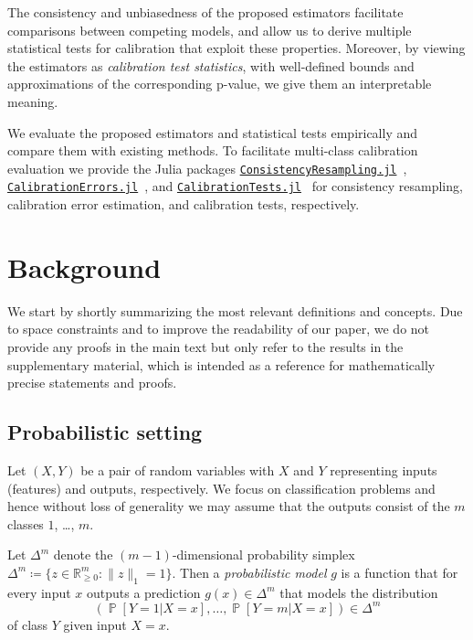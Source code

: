 \documentclass{article}
\DeclareMathOperator{\Prob}{\mathbb{P}}
\begin{document}
The consistency and unbiasedness of the proposed estimators facilitate
comparisons between competing models, and allow us to derive multiple
statistical tests for calibration that exploit these properties. Moreover, by
viewing the estimators as \emph{calibration test statistics}, with well-defined
bounds and approximations of the corresponding p-value, we give them an
interpretable meaning.

We evaluate the proposed estimators and statistical tests empirically and
compare them with existing methods. To facilitate multi-class calibration
evaluation we provide the Julia packages \href{https://github.com/devmotion/ConsistencyResampling.jl}{\texttt{ConsistencyResampling.jl}}~\citep{widmann19_consis_resampling},
\href{https://github.com/devmotion/CalibrationErrors.jl}{\texttt{CalibrationErrors.jl}}~\citep{widmann19_calib_errors}, and
\href{https://github.com/devmotion/CalibrationTests.jl}{\texttt{CalibrationTests.jl}}~\citep{widmann19_calib_tests}
for consistency resampling, calibration error estimation, and calibration tests,
respectively.

\section{Background}

We start by shortly summarizing the most relevant definitions and concepts. Due
to space constraints and to improve the readability of our paper, we do not
provide any proofs in the main text but only refer to the results in the
supplementary material, which is intended as a reference for mathematically
precise statements and proofs.

\subsection{Probabilistic setting}

Let $(X,Y)$ be a pair of random variables with $X$ and $Y$ representing inputs
(features) and outputs, respectively. We focus on classification problems and
hence without loss of generality we may assume that the outputs consist of the
$m$ classes $1$, \ldots, $m$.

Let $\Delta^m$ denote the $(m-1)$-dimensional probability simplex
$\Delta^m \coloneqq \{ z \in \mathbb{R}_{\geq 0}^m \colon \|z\|_1 = 1\}$. Then
a \emph{probabilistic model} $g$ is a function that for every input $x$ outputs
a prediction $g(x) \in \Delta^m$ that models the distribution
\begin{equation*}
    (\Prob[Y = 1|X = x], \ldots, \Prob[Y=m|X = x]) \in \Delta^m
\end{equation*}
of class $Y$ given input $X = x$.
\end{document}
